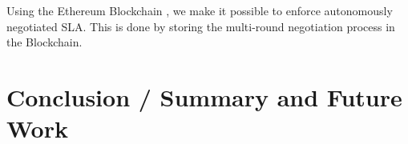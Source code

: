 
Using the Ethereum Blockchain , we make it possible to enforce autonomously negotiated SLA. This is done by storing the multi-round negotiation process in the Blockchain. 

\chapter{Conclusion / Summary and Future Work}

